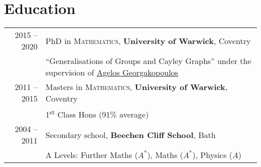 \documentclass[a4paper,10pt]{article}
\begin{document}
\section{Education}
\begin{tabular}{rl}	
	\textsc{} 2015 -- 2020 & PhD in \textsc{Mathematics}, \textbf{University of Warwick}, Coventry\\
	& ``Generalisations of Groups and Cayley Graphs'' under the supervision of \href{https://homepages.warwick.ac.uk/~maslar/}{Agelos Georgakopoulos}\\
	\textsc{} 2011 -- 2015& Masters in \textsc{Mathematics}, \textbf{University of Warwick}, Coventry\\
	& 1\textsuperscript{st} Class Hons (91\% average)\\
	\textsc{} 2004 -- 2011& Secondary school, \textbf{Beechen Cliff School}, Bath\\
	&  A Levels: Further Maths ($A^{\ast}$), Maths ($A^{\ast}$), Physics ($A$)\\
\end{tabular}
\end{document}
